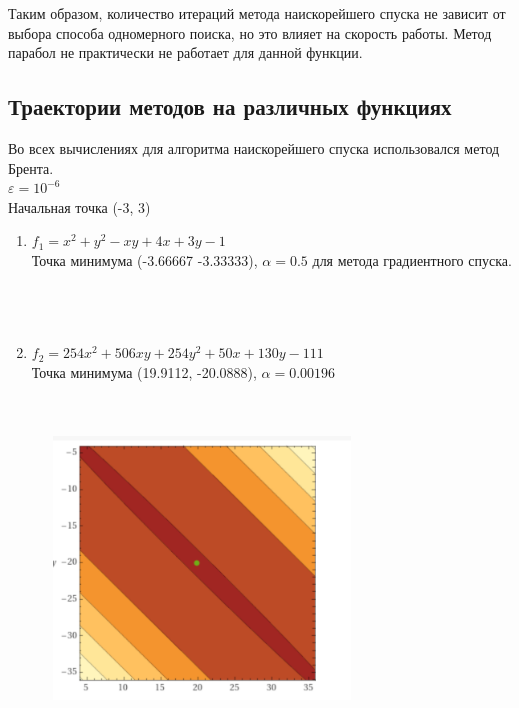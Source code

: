 Таким образом, количество итераций метода наискорейшего спуска не зависит от выбора способа одномерного поиска, но это влияет на скорость работы. Метод парабол не практически не работает для данной функции.

\subsection{Траектории методов на различных функциях}
Во всех вычислениях для алгоритма наискорейшего спуска использовался метод Брента.\\
$\varepsilon = 10^{-6}$ \\
Начальная точка (-3, 3) \\

\begin{enumerate}
	\item \(f_1 = x^2 + y^2 - xy + 4x + 3y - 1\) \\
	      Точка минимума (-3.66667 -3.33333), $\alpha = 0.5$ для метода градиентного спуска. \\
	      \\
	       \\
	      \


	\item \(f_2 = 254x^2 + 506xy + 254y^2 + 50x + 130y - 111\) \\
	      Точка минимума (19.9112, -20.0888), $\alpha = 0.00196$ \\
	      \\
	       \\

	      \begin{center}
		      \includegraphics[width=9cm, height=7cm]{img/f2.png}
	      \end{center}


\end{enumerate}
